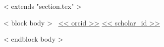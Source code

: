 ~< extends "section.tex" >~

~< block body >~
\vspace{-8mm}
\hfill
{}
\href{https://orcid.org/<< orcid >>}{\textcolor{orcidlogocol}{<< orcid >>}}
\hspace{1mm}
\href{https://scholar.google.com/citations?user=<< scholar_id >>}{\textcolor{googlescholarlogocol}{<< scholar_id >>}}
\vspace{2mm}

\renewcommand*{\bibfont}{\small}

\begin{refsection}
\nocite{*}
\printbibliography[heading=none] %
\end{refsection}

~< endblock body >~
